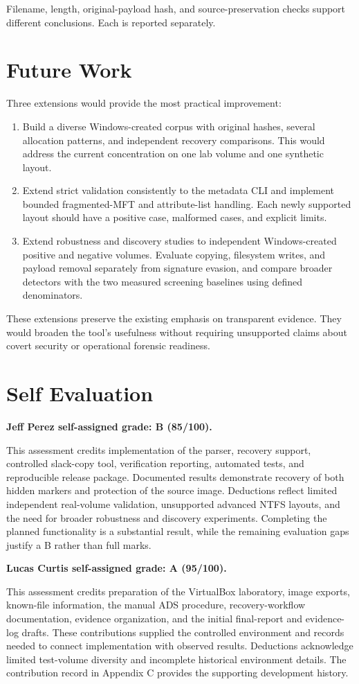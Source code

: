 Filename, length, original-payload hash, and source-preservation checks
support different conclusions. Each is reported separately.

\section{Future Work}
Three extensions would provide the most practical improvement:
\begin{enumerate}
\item Build a diverse Windows-created corpus with original hashes, several
allocation patterns, and independent recovery comparisons. This would
address the current concentration on one lab volume and one synthetic layout.
\item Extend strict validation consistently to the metadata CLI and implement
bounded fragmented-MFT and attribute-list handling. Each newly supported
layout should have a positive case, malformed cases, and explicit limits.
\item Extend robustness and discovery studies to independent Windows-created
positive and negative volumes. Evaluate copying, filesystem writes, and payload
removal separately from signature evasion, and compare broader detectors with
the two measured screening baselines using defined denominators.
\end{enumerate}

These extensions preserve the existing emphasis on transparent evidence.
They would broaden the tool's usefulness without requiring unsupported
claims about covert security or operational forensic readiness.

\section{Self Evaluation}
\noindent\textbf{Jeff Perez self-assigned grade: B (85/100).}

This assessment credits implementation of the parser, recovery support,
controlled slack-copy tool, verification reporting, automated tests, and
reproducible release package. Documented results demonstrate recovery of
both hidden markers and protection of the source image. Deductions reflect
limited independent real-volume validation, unsupported advanced NTFS
layouts, and the need for broader robustness and discovery experiments.
Completing the planned functionality is a substantial result, while the
remaining evaluation gaps justify a B rather than full marks.

\newpage
\noindent\textbf{Lucas Curtis self-assigned grade: A (95/100).}

This assessment credits preparation of the VirtualBox laboratory, image
exports, known-file information, the manual ADS procedure, recovery-workflow
documentation, evidence organization, and the initial final-report and
evidence-log drafts. These contributions supplied the controlled environment
and records needed to connect implementation with observed results.
Deductions acknowledge limited test-volume diversity and incomplete
historical environment details. The contribution record in Appendix C
provides the supporting development history.
